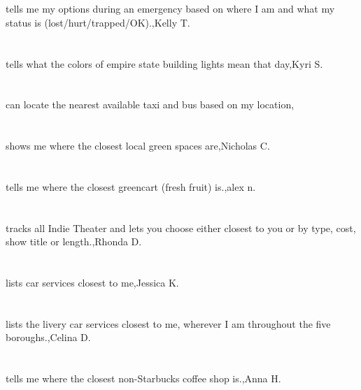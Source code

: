 \section{} tells me my options during an emergency based on where I am and what my status is (lost/hurt/trapped/OK).,Kelly T.	
\section{}tells what the colors of empire state building lights mean that day,Kyri S.	
\section{}can locate the nearest available taxi and bus based on my location,	
\section{}shows me where the closest local green spaces are,Nicholas C.	
\section{}tells me where the closest greencart (fresh fruit) is.,alex n.	
\section{}tracks all Indie Theater and lets you choose either closest to you or by type, cost, show title or length.,Rhonda D.
\section{} lists car services closest to me,Jessica K.
\section{} lists the livery car services closest to me, wherever I am throughout the five boroughs.,Celina D.
\section{} tells me where the closest non-Starbucks coffee shop is.,Anna H.
